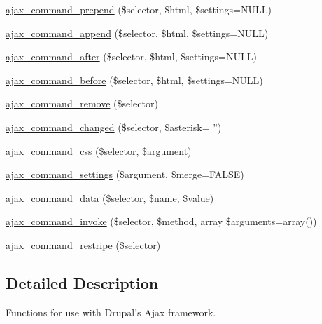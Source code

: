 \begin{DoxyCompactItemize}
\hyperlink{group__ajax__commands_gaafaae3874d173618f88c0baa1fdab12b}{ajax\_\-command\_\-prepend} (\$selector, \$html, \$settings=NULL)
\item 
\hyperlink{group__ajax__commands_ga861a6cb3b7347211edce388a2b446f91}{ajax\_\-command\_\-append} (\$selector, \$html, \$settings=NULL)
\item 
\hyperlink{group__ajax__commands_ga530d78ba7ea73497567e401a42fbbf94}{ajax\_\-command\_\-after} (\$selector, \$html, \$settings=NULL)
\item 
\hyperlink{group__ajax__commands_gafb261431270ce894d69e58a051ee9ead}{ajax\_\-command\_\-before} (\$selector, \$html, \$settings=NULL)
\item 
\hyperlink{group__ajax__commands_gadd65f6f231cc96812c810c54e36d9011}{ajax\_\-command\_\-remove} (\$selector)
\item 
\hyperlink{group__ajax__commands_ga64ba8a2e560b17e4fc8ca090a37314a0}{ajax\_\-command\_\-changed} (\$selector, \$asterisk= '')
\item 
\hyperlink{group__ajax__commands_gafb1f836e8545dad1a4a391e21404fb86}{ajax\_\-command\_\-css} (\$selector, \$argument)
\item 
\hyperlink{group__ajax__commands_ga3e41169f97184258a213d512cef81131}{ajax\_\-command\_\-settings} (\$argument, \$merge=FALSE)
\item 
\hyperlink{group__ajax__commands_gad092aa7cd3258f6ed7f18f9f2f8cb8db}{ajax\_\-command\_\-data} (\$selector, \$name, \$value)
\item 
\hyperlink{group__ajax__commands_gac49706a740d78d75f6a55bd2dba21c80}{ajax\_\-command\_\-invoke} (\$selector, \$method, array \$arguments=array())
\item 
\hyperlink{group__ajax__commands_ga59f78e53dfd51237ccedfaa0266b7f37}{ajax\_\-command\_\-restripe} (\$selector)
\end{DoxyCompactItemize}


\subsection{Detailed Description}
Functions for use with Drupal's Ajax framework. 